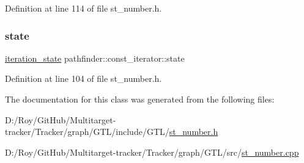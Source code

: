 Definition at line 114 of file st\+\_\+number.\+h.

\mbox{\label{classpathfinder_1_1const__iterator_aa63c53f506ead02a0147e88f02b909cd}} 
\subsubsection{\texorpdfstring{state}{state}}
{\footnotesize\ttfamily \mbox{\hyperlink{classpathfinder_1_1const__iterator_a0f4ffc8bec85488c37e68ddb247e6e47}{iteration\+\_\+state}} pathfinder\+::const\+\_\+iterator\+::state\hspace{0.3cm}{\ttfamily [private]}}



Definition at line 104 of file st\+\_\+number.\+h.



The documentation for this class was generated from the following files\+:\begin{DoxyCompactItemize}
\item 
D\+:/\+Roy/\+Git\+Hub/\+Multitarget-\/tracker/\+Tracker/graph/\+G\+T\+L/include/\+G\+T\+L/\mbox{\hyperlink{st__number_8h}{st\+\_\+number.\+h}}\item 
D\+:/\+Roy/\+Git\+Hub/\+Multitarget-\/tracker/\+Tracker/graph/\+G\+T\+L/src/\mbox{\hyperlink{st__number_8cpp}{st\+\_\+number.\+cpp}}\end{DoxyCompactItemize}
